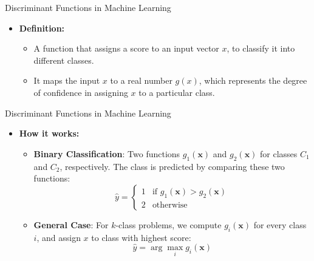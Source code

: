 \documentclass[serif, aspectratio=169]{beamer}
\begin{document}
\begin{frame}{Discriminant Functions in Machine Learning}
    \begin{itemize}
        \item \textbf{Definition:}
        \medskip
        \begin{itemize}\itemsep1.5em
            \item \justifying A function that assigns a score to an input vector $x$, to classify it into different classes.
            \item \justifying It maps the input \textbf{$x$} to a real number \textbf{$g(x)$}, which represents the degree of confidence in assigning \textbf{$x$} to a particular class.
        \end{itemize}
    \end{itemize}
\end{frame}

\begin{frame}{Discriminant Functions in Machine Learning}
    \begin{itemize}
        \item \textbf{How it works:}
        \medskip
        \begin{itemize}\itemsep1.5em
            \item \justifying \textbf{Binary Classification}: Two functions \textbf{$g_1(\mathbf{x})$} and \textbf{$g_2(\mathbf{x})$} for classes $C_1$ and $C_2$, respectively. The class is predicted by comparing these two functions:
            \[
                \hat{y} =
                \begin{cases} 
                    1 & \text{if } g_1(\mathbf{x}) > g_2(\mathbf{x}) \\
                    2 & \text{otherwise}
                \end{cases}
            \]

            \item \justifying \textbf{General Case}: For $k$-class problems, we compute \textbf{$g_i(\mathbf{x})$} for every class $i$, and assign \textbf{$x$} to class with highest score:
            $$
                \hat{y} = \arg \max_i g_i(\mathbf{x})
            $$
        \end{itemize}
    \end{itemize}
\end{frame}
\end{document}
